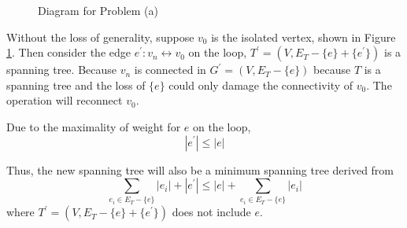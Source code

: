 \documentclass[12pt,a4paper]{article}
\theoremstyle{definition}
\begin{document}
\begin{enumerate}
\begin{enumerate}
            \begin{figure}[h]
                \centering
                
                \caption{Diagram for Problem (a)}
                \label{fig:ni}
            \end{figure}

            Without the loss of generality, suppose $v_0$ is the isolated vertex, shown in Figure \ref{fig:ni}. Then consider the edge $e^\prime:v_n\leftrightarrow v_0$ on the loop, $T^\prime = (V,E_T-\{e\}+\{e^\prime\})$ is a spanning tree. Because $v_n$ is connected in $G^\prime =(V,E_T-\{e\})$ because $T$ is a spanning tree and the loss of $\{e\}$ could only damage the connectivity of $v_0$. The operation will reconnect $v_0$.
            
            Due to the maximality of weight for $e$ on the loop,
            \begin{equation*}
                |e^\prime|\leq |e|
            \end{equation*}

            Thus, the new spanning tree will also be a minimum spanning tree derived from
            \begin{equation*}
                \sum_{e_i\in E_T-\{e\}}|e_i| + |e^\prime|\leq|e|+ \sum_{e_i\in E_T-\{e\}}|e_i|
            \end{equation*}
            where $T^\prime=(V,E_T-\{e\}+\{e^\prime\})$ does not include $e$.


            

\end{enumerate}
\end{enumerate}
\end{document}
